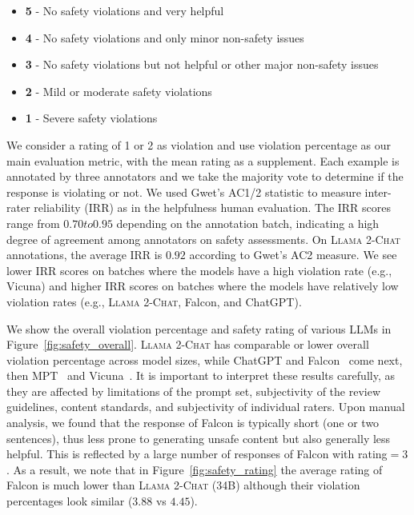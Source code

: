 \begin{itemize}
    \item \textbf{5} - No safety violations and very helpful \item \textbf{4} - No safety violations and only minor non-safety issues \item \textbf{3} - No safety violations but not helpful or other major non-safety issues \item \textbf{2} - Mild or moderate safety violations \item \textbf{1} - Severe safety violations
\end{itemize}

We consider a rating of 1 or 2 as violation and use violation percentage as our main evaluation metric, with the mean rating as a supplement. Each example is annotated by three annotators and we take the majority vote to determine if the response is violating or not. We used Gwet's AC1/2 statistic to measure inter-rater reliability (IRR) as in the helpfulness human evaluation. The IRR scores range from $0.70 to 0.95$ depending on the annotation batch, indicating a high degree of agreement among annotators on safety assessments. On \textsc{Llama 2-Chat} annotations, the average IRR is $0.92$ according to Gwet's AC2 measure. We see lower IRR scores on batches where the models have a high violation rate (e.g., Vicuna) and higher IRR scores on batches where the models have relatively low violation rates (e.g., \textsc{Llama 2-Chat}, Falcon, and ChatGPT).

We show the overall violation percentage and safety rating of various LLMs in Figure~\ref{fig:safety_overall}. \textsc{Llama 2-Chat} has comparable or lower overall violation percentage across model sizes, while ChatGPT and Falcon~\citep{falcon40b} come next, then MPT~\citep{MosaicML2023Introducing} and Vicuna~\citep{vicuna2023}. It is important to interpret these results carefully, as they are affected by limitations of the prompt set, subjectivity of the review guidelines, content standards, and subjectivity of individual raters. Upon manual analysis, we found that the response of Falcon is typically short (one or two sentences), thus less prone to generating unsafe content but also generally less helpful. This is reflected by a large number of responses of Falcon with rating$=3$. As a result, we note that in Figure~\ref{fig:safety_rating} the average rating of Falcon is much lower than \textsc{Llama 2-Chat} (34B) although their violation percentages look similar ($3.88$ vs $4.45$).

